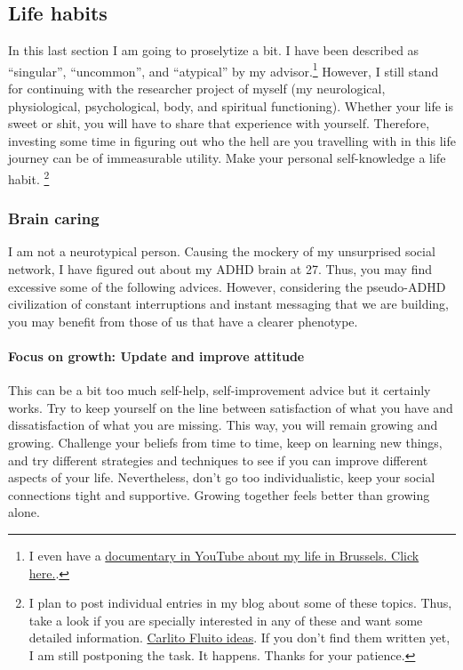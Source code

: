 \documentclass{article}
\begin{document}
\subsection{Life habits}
\label{subsubsec: Life}
In this last section I am going to proselytize a bit. I have been described as ``singular'', ``uncommon'', and ``atypical'' by my advisor.\footnote{I even have a \href{https://www.youtube.com/watch?v=4lvSzHfc8FU}{documentary in YouTube about my life in Brussels. Click here.}. } However, I still stand for continuing with the researcher project of myself (my neurological, physiological, psychological, body, and spiritual functioning). Whether your life is sweet or shit, you will have to share that experience with yourself. Therefore, investing some time in figuring out who the hell are you travelling with in this life journey can be of immeasurable utility. Make your personal self-knowledge a life habit. \footnote{I plan to post individual entries in my blog about some of these topics. Thus, take a look if you are specially interested in any of these and want some detailed information. \href{www.carlitofluitoideas.com.}{Carlito Fluito ideas}. If you don’t find them written yet, I am still postponing the task. It happens. Thanks for your patience.}
\subsubsection{Brain caring}
\label{subsubsec: Brain}
I am not a neurotypical person. Causing the mockery of my unsurprised social network, I have figured out about my ADHD brain at 27. Thus, you may find excessive some of the following advices. However, considering the pseudo-ADHD civilization of constant interruptions and instant messaging that we are building, you may benefit from those of us that have a clearer phenotype. 
\paragraph{Focus on growth: Update and improve attitude}
This can be a bit too much self-help, self-improvement advice but it certainly works. Try to keep yourself on the line between satisfaction of what you have and dissatisfaction of what you are missing. This way, you will remain growing and growing. Challenge your beliefs from time to time, keep on learning new things, and try different strategies and techniques to see if you can improve different aspects of your life. Nevertheless, don’t go too individualistic, keep your social connections tight and supportive. Growing together feels better than growing alone.
\end{document}
